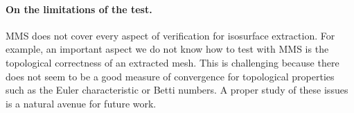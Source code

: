 

\paragraph*{On the limitations of the test.}
MMS does not cover every aspect of verification for
isosurface extraction. For example, an important aspect we do not
know how to test with MMS is the topological correctness of an
extracted mesh. This is challenging because there does not seem to
be a good measure of convergence for topological properties
such as the Euler characteristic or Betti numbers. A proper study of
these issues is a natural avenue for future work.

%
%

